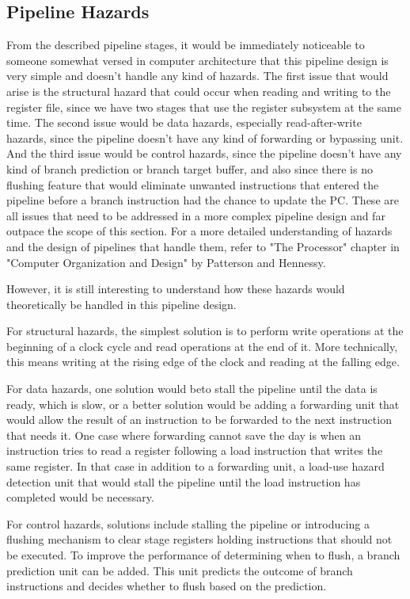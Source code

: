 \subsection{Pipeline Hazards}
From the described pipeline stages, it would be immediately noticeable to someone somewhat versed in computer architecture that this pipeline design is very simple and doesn't handle any kind of hazards. The first issue that would arise is the structural hazard that could occur when reading and writing to the register file, since we have two stages that use the register subsystem at the same time. The second issue would be data hazards, especially read-after-write hazards, since the pipeline doesn't have any kind of forwarding or bypassing unit. And the third issue would be control hazards, since the pipeline doesn't have any kind of branch prediction or branch target buffer, and also since there is no flushing feature that would eliminate unwanted instructions that entered the pipeline before a branch instruction had the chance to update the PC. These are all issues that need to be addressed in a more complex pipeline design and far outpace the scope of this section. For a more detailed understanding of hazards and the design of pipelines that handle them, refer to "The Processor" chapter in "Computer Organization and Design" by Patterson and Hennessy\cite{patterson1994computer}.

However, it is still interesting to understand how these hazards would theoretically be handled in this pipeline design.

For structural hazards, the simplest solution is to perform write operations at the beginning of a clock cycle and read operations at the end of it. More technically, this means writing at the rising edge of the clock and reading at the falling edge.

For data hazards, one solution would beto stall the pipeline until the data is ready, which is slow, or a better solution would be adding a forwarding unit that would allow the result of an instruction to be forwarded to the next instruction that needs it. One case where forwarding cannot save the day is when an instruction tries to read a register following a load instruction that writes the same register\cite{patterson1994computer}. In that case in addition to a forwarding unit, a load-use hazard detection unit that would stall the pipeline until the load instruction has completed would be necessary.

For control hazards, solutions include stalling the pipeline or introducing a flushing mechanism to clear stage registers holding instructions that should not be executed. To improve the performance of determining when to flush, a branch prediction unit can be added. This unit predicts the outcome of branch instructions and decides whether to flush based on the prediction\cite{patterson1994computer}.


